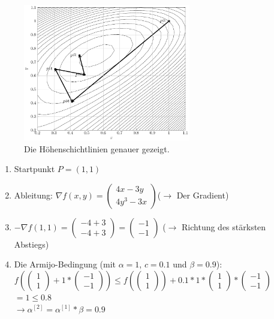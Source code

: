 \documentclass[naustrian]{article}
\begin{document}
{\begin{figure}[h]
    \centering
    \includegraphics[width=0.65\textwidth]{grad/figure2}
    \caption{Die Höhenschichtlinien genauer gezeigt.}
\end{figure}

\begin{enumerate}
	\item
	Startpunkt $P=(1,1)$
	\item
	Ableitung: ${\nabla}f(x,y)=
	\left( \begin{array}{c}
	4x-3y \\
	4y^3-3x
	\end{array} \right)
	$($\rightarrow$ Der Gradient)
	\item
	$-{\nabla}f(1,1) =
	\left( \begin{array}{c}
	-4+3 \\
	-4+3
	\end{array} \right)
	=
	\left( \begin{array}{c}
	-1 \\
	-1
	\end{array} \right)
	$ ($\rightarrow$ Richtung des stärksten Abstiegs)
	\item
	Die Armijo-Bedingung (mit $\alpha = 1$, $c = 0.1$ und $\beta = 0.9$):\\
	$f( \left( \begin{array}{c} 1 \\ 1 \end{array} \right) + 1 * \left( \begin{array}{c} -1 \\ -1 \end{array} \right)) \leq f(\left( \begin{array}{c} 1 \\ 1 \end{array} \right)) + 0.1 * 1 *  \left( \begin{array}{c} 1 \\ 1 \end{array} \right) * \left( \begin{array}{c} -1 \\ -1 \end{array} \right)$ \\
	$= 1 \leq 0.8$ \\
	$\rightarrow \alpha^{[2]} = \alpha^{[1]} * \beta = 0.9$ \\


\end{enumerate}}
\end{document}
